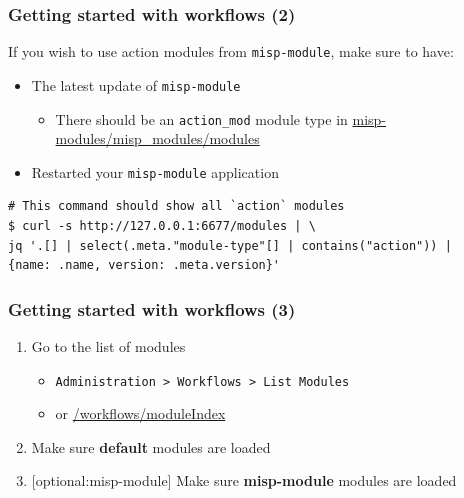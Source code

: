\begin{frame}[fragile]
    \frametitle{Getting started with workflows (2)}
    If you wish to use action modules from \texttt{misp-module}, make sure to have:
    \begin{itemize}
        \item The latest update of \texttt{misp-module}
        \begin{itemize}
            \item There should be an \texttt{action\_mod} module type in \url{misp-modules/misp\_modules/modules}
        \end{itemize}
        \item Restarted your \texttt{misp-module} application
    \end{itemize}
    \begin{lstlisting}[language=text,firstnumber=1]
# This command should show all `action` modules
$ curl -s http://127.0.0.1:6677/modules | \
jq '.[] | select(.meta."module-type"[] | contains("action")) |
{name: .name, version: .meta.version}'
    \end{lstlisting}
\end{frame}

\begin{frame}
    \frametitle{Getting started with workflows (3)}
    \begin{enumerate}
        \item Go to the list of modules
        \begin{itemize}
            \item \texttt{Administration > Workflows > List Modules}
            \item or \url{/workflows/moduleIndex}
        \end{itemize}
        \item Make sure \textbf{default} modules are loaded
        \item {[optional:misp-module]} Make sure \textbf{misp-module} modules are loaded
    \end{enumerate}
\end{frame}

